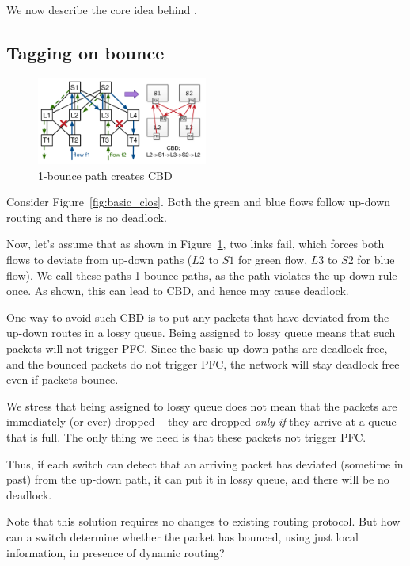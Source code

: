 We now describe the core idea behind \sysname{}.

\subsection{Tagging on bounce}
\label{subsec:tag}

\begin{figure}[t]
	\centering
	\includegraphics[width=0.5\textwidth] {figs/cbd_a}
	\caption{1-bounce path creates CBD}
	\label{fig:clos_1_bounce}
\end{figure}

Consider Figure~\ref{fig:basic_clos}. Both the green and blue flows follow up-down
routing and there is no deadlock.

Now, let's assume that as shown in Figure~\ref{fig:clos_1_bounce}, two
links fail, which forces both flows to deviate from up-down paths ($L2$ to
$S1$ for green flow, $L3$ to $S2$ for blue flow). We call these paths 1-bounce
paths, as the path violates the up-down rule once. As shown, this can lead to
CBD, and hence may cause deadlock.

One way to avoid such CBD is to put any packets that have deviated from the
up-down routes in a lossy queue.  Being assigned to lossy queue means that such
packets will not trigger PFC. Since the basic up-down paths are deadlock free,
and the bounced packets do not trigger PFC, the network will stay deadlock free
even if packets bounce.

We stress that being assigned to lossy queue does not mean that the packets are
immediately (or ever) dropped -- they are dropped {\em only if} they arrive at a
queue that is full. The only thing we need is that these packets not trigger
PFC.

Thus, if each switch can detect that an arriving packet has deviated (sometime
in past) from the up-down path, it can put it in lossy queue, and there will be
no deadlock.

Note that this solution requires no changes to existing routing protocol.  But
how can a switch determine whether the packet has bounced, using just local
information, in presence of dynamic routing?

